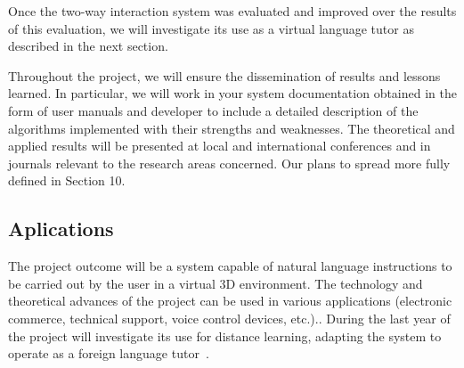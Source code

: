 Once the two-way interaction system was evaluated and improved over the results
of this evaluation, we will investigate its use as a virtual language tutor as
described in the next section.


Throughout the project, we will ensure the dissemination of results and lessons
learned. In particular, we will work in your system documentation obtained in
the form of user manuals and developer to include a detailed description of the
algorithms implemented with their strengths and weaknesses. The theoretical and
applied results will be presented at local and international conferences and in
journals relevant to the research areas concerned. Our plans to spread more
fully defined in Section 10. 


\subsection{Aplications}


The project outcome will be a system capable of natural language instructions to
be carried out by the user in a virtual 3D environment. The technology and
theoretical advances of the project can be used in various applications
(electronic commerce, technical support, voice control devices, etc.).. During
the last year of the project will investigate its use for distance learning,
adapting the system to operate as a foreign language
tutor~\cite{Eskenazi09,Wik09}.

